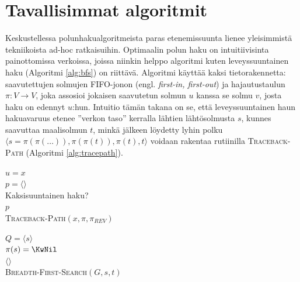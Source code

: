 \documentclass[finnish]{tktltiki2}
\newenvironment{finalgo}[1][htb]{
  \renewcommand{\algorithmcfname}{Algoritmi}
  \begin{algorithm}[#1]
}{\end{algorithm}}
\let\oldnl\nl%
\newcommand{\nonl}{\renewcommand{\nl}{\let\nl\oldnl}}
\theoremstyle{definition}
\theoremstyle{remark}
\begin{document}
\section{Tavallisimmat algoritmit}
Keskustellessa polunhakualgoritmeista paras etenemissuunta lienee yleisimmistä tekniikoista ad-hoc ratkaisuihin. Optimaalin polun haku on intuitiivisinta painottomissa verkoissa, joissa niinkin helppo algoritmi kuten leveyssuuntainen haku (Algoritmi \ref{alg:bfs}) on riittävä. Algoritmi käyttää kaksi tietorakennetta: saavutettujen solmujen FIFO-jonon (engl. \textit{first-in, first-out}) ja hajautustaulun $\pi \colon V \to V$, joka assosioi jokaisen saavutetun solmun $u$ kanssa se solmu $v$, josta haku on edennyt $u$:hun. Intuitio tämän takana on se, että leveyssuuntainen haun hakuavaruus etenee ''verkon taso'' kerralla lähtien lähtösolmusta $s$, kunnes saavuttaa maalisolmun $t$, minkä jälkeen löydetty lyhin polku $\langle s = \pi(\pi(\dots)), \pi(\pi(t)), \pi(t), t \rangle$ voidaan rakentaa rutiinilla \textsc{Traceback-Path} (Algoritmi \ref{alg:tracepath}).
\begin{finalgo}
$u = x$ \\
$p = \langle  \rangle$ \\
\nonl Kaksisuuntainen haku? \\
\KwRet $p$ \\
\caption{\textsc{Traceback-Path}$(x, \pi, \pi_{REV})$}
\label{alg:tracepath}
\end{finalgo}

\begin{finalgo}
  $Q = \langle s \rangle$ \\
  $\pi(s) = \KwNil$ \\
  \KwRet $\langle \rangle$ \\
\caption{\textsc{Breadth-First-Search}$(G, s, t)$}
\label{alg:bfs}
\end{finalgo}
\end{document}
